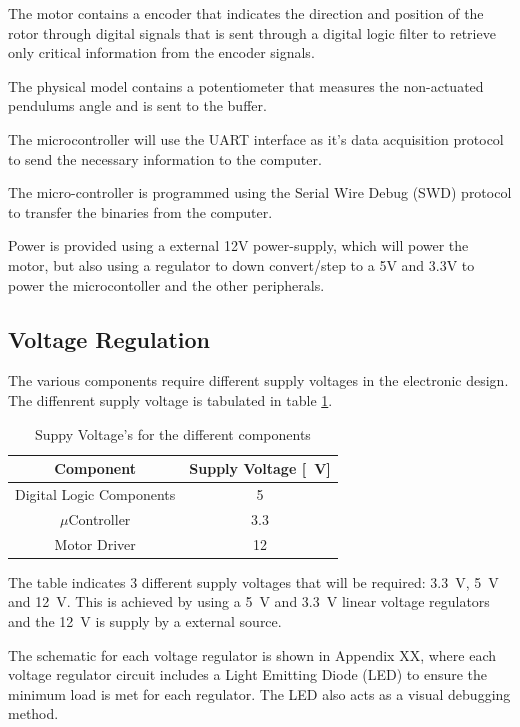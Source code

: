 \documentclass[a4paper,12pt]{article}
\begin{document}
	The motor contains a encoder that indicates the direction and position of the rotor through digital signals that is sent through a digital logic filter to retrieve only critical information from the encoder signals. 
	
	The physical model contains a potentiometer that measures the non-actuated pendulums angle and is sent to the buffer.
	
	The microcontroller will use the UART interface as it's data acquisition protocol to send the necessary information to the computer. 
	
	The micro-controller is programmed using the Serial Wire Debug (SWD) protocol to transfer the binaries from the computer.
	
	Power is provided using a external 12V power-supply, which will power the motor, but also using a regulator to down convert/step to a 5V and 3.3V to power the microcontoller and the other peripherals.
	
	\subsection{Voltage Regulation}
	
	The various components require different supply voltages in the electronic design. The diffenrent supply voltage is tabulated in table \ref{table:supplyVoltage}.
	
		\begin{table}[]
			\centering
			\begin{tabular}{|c|c|}
				\hline
				Component & Supply Voltage [\SI{}{V}] \\
				\hline
				\hline
				Digital Logic Components & \SI{5}{} \\
				\hline
				$\mu$Controller & \SI{3.3}{} \\
				\hline
				Motor Driver & \SI{12}{} \\
				\hline
			\end{tabular}
		\caption{Suppy Voltage's for the different components}
		\label{table:supplyVoltage}
		\end{table}
	
	
	The table indicates 3 different supply voltages that will be required: \SI{3.3}{V}, \SI{5}{V} and \SI{12}{V}. This is achieved by using a \SI{5}{V} and \SI{3.3}{V} linear voltage regulators and the \SI{12}{V} is supply by a external source.
	
	The schematic for each voltage regulator is shown in Appendix XX, where each voltage regulator circuit includes a Light Emitting Diode (LED) to ensure the minimum load is met for each regulator. The LED also acts as a visual debugging method.
\end{document}

